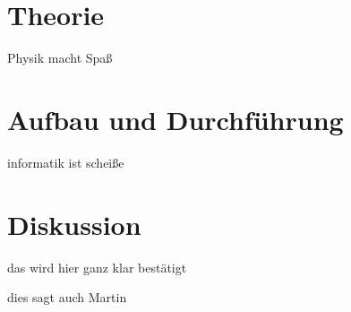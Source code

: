 \documentclass[bibliography=totoc]{scrartcl}
\begin{document}
\section{Theorie}

Physik macht Spaß \cite[1--3]{deGennes}

\section{Aufbau und Durchführung}

informatik ist scheiße \cite[10]{magnet}

\section{Diskussion}

das wird hier ganz klar bestätigt \cite[20--21]{kent}

dies sagt auch Martin\cite[5]{Martin}

\printbibliography
\end{document}

